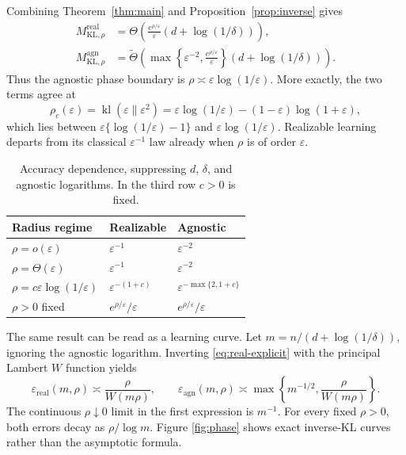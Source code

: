 \documentclass{article}
\theoremstyle{remark}
\newcommand{\kl}{\operatorname{kl}}
\newcommand{\eps}{\varepsilon}
\begin{document}
Combining Theorem~\ref{thm:main} and Proposition~\ref{prop:inverse} gives
\begin{align}
 M^{\mathrm{real}}_{\mathrm{KL},\rho}
 &=\Theta\!\left(
 \frac{e^{\rho/\eps}}{\eps}(d+\log(1/\delta))\right),
 \label{eq:real-explicit}\\
 M^{\mathrm{agn}}_{\mathrm{KL},\rho}
 &=\widetilde\Theta\!\left(
 \max\left\{\eps^{-2},\frac{e^{\rho/\eps}}{\eps}\right\}
 (d+\log(1/\delta))\right).
 \label{eq:agn-explicit}
\end{align}
Thus the agnostic phase boundary is $\rho\asymp\eps\log(1/\eps)$.  More exactly, the two terms agree at
\begin{equation}
 \rho_c(\eps)=\kl(\eps\|\eps^2)
 =\eps\log(1/\eps)-(1-\eps)\log(1+\eps),
 \label{eq:exact-crossover}
\end{equation}
which lies between $\eps\{\log(1/\eps)-1\}$ and $\eps\log(1/\eps)$.  Realizable learning departs from its classical $\eps^{-1}$ law already when $\rho$ is of order $\eps$.

\begin{table}[b]
\centering
\caption{Accuracy dependence, suppressing $d$, $\delta$, and agnostic
logarithms.  In the third row $c>0$ is fixed.}
\label{tab:regimes}
\small
\begin{tabular}{lll}
\toprule
Radius regime & Realizable & Agnostic \\
\midrule
$\rho=o(\eps)$ & $\eps^{-1}$ & $\eps^{-2}$ \\
$\rho=\Theta(\eps)$ & $\eps^{-1}$ & $\eps^{-2}$ \\
$\rho=c\eps\log(1/\eps)$ & $\eps^{-(1+c)}$ &
$\eps^{-\max\{2,1+c\}}$ \\
$\rho>0$ fixed & $e^{\rho/\eps}/\eps$ & $e^{\rho/\eps}/\eps$ \\
\bottomrule
\end{tabular}
\end{table}

The same result can be read as a learning curve.  Let $m=n/(d+\log(1/\delta))$, ignoring the agnostic logarithm.  Inverting \eqref{eq:real-explicit} with the principal Lambert $W$ function \citep{corless1996lambertw} yields
\begin{equation}
 \eps_{\mathrm{real}}(m,\rho)\asymp\frac{\rho}{W(m\rho)},
 \qquad
 \eps_{\mathrm{agn}}(m,\rho)\asymp
 \max\left\{m^{-1/2},\frac{\rho}{W(m\rho)}\right\}.
 \label{eq:learning-curves}
\end{equation}
The continuous $\rho\downarrow0$ limit in the first expression is $m^{-1}$. For every fixed $\rho>0$, both errors decay as $\rho/\log m$.  Figure \ref{fig:phase} shows exact inverse-KL curves rather than the asymptotic formula.
\end{document}
